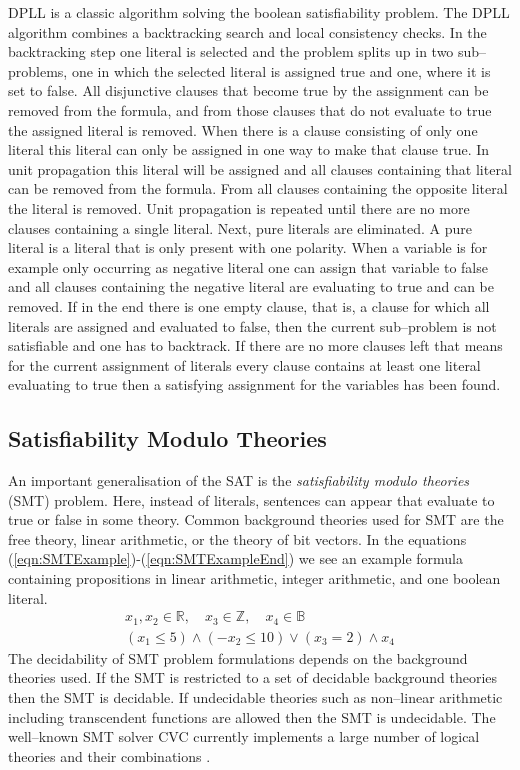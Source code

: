 DPLL \cite{DPLL} is a classic algorithm solving the boolean satisfiability problem. The DPLL algorithm combines a backtracking search and local consistency checks. In the backtracking step one literal is selected and the problem splits up in two sub--problems, one in which the selected literal is assigned true and one, where it is set to false. All disjunctive clauses that become true by the assignment can be removed from the formula, and from those clauses that do not evaluate to true the assigned literal is removed. When there is a clause consisting of only one literal this literal can only be assigned in one way to make that clause true. In unit propagation this literal will be assigned and all clauses containing that literal can be removed from the formula. From all clauses containing the opposite literal the literal is removed. Unit propagation is repeated until there are no more clauses containing a single literal. Next, pure literals are eliminated. A pure literal is a literal that is only present with one polarity. When a variable is for example only occurring as negative literal one can assign that variable to false and all clauses containing the negative literal are evaluating to true and can be removed. If in the end there is one empty clause, that is, a clause for which all literals are assigned and evaluated to false, then the current sub--problem is not satisfiable and one has to backtrack. If there are no more clauses left that means for the current assignment of literals every clause contains at least one literal evaluating to true then a satisfying assignment for the variables has been found.
\subsection{Satisfiability Modulo Theories}
\label{sec:MathSMT}
An important generalisation of the SAT is the \emph{satisfiability modulo theories} (SMT) problem. Here, instead of literals, sentences can appear that evaluate to true or false in some theory. Common background theories used for SMT are the free theory, linear arithmetic, or the theory of bit vectors. In the equations (\ref{eqn:SMTExample})-(\ref{eqn:SMTExampleEnd}) we see an example formula containing propositions in linear arithmetic, integer arithmetic, and one boolean literal.
\begin{eqnarray}
\label{eqn:SMTExample}
x_1,x_2\in \mathbb{R}, \quad x_3 \in \mathbb{Z},\quad x_4\in \mathbb{B}\\
\label{eqn:SMTExampleEnd}
(x_1\leq 5) \land (-x_2\leq 10) \lor (x_3=2) \land x_4
\end{eqnarray}
The decidability of SMT problem formulations depends on the background theories used. If the SMT is restricted to a set of decidable background theories then the SMT is decidable. If undecidable theories such as non--linear arithmetic including transcendent functions are allowed then the SMT is undecidable. The well--known SMT solver CVC currently implements a large number of logical theories and their combinations \cite{cvc}.\\
